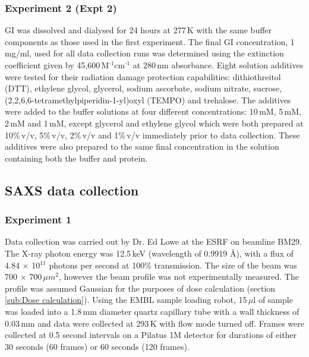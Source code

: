 \subsubsection{Experiment 2 (Expt 2)}
\label{subs:Experiment 2 - sample prep}
GI was dissolved and dialysed for 24 hours at 277$\,$K with the same buffer components as those used in the first experiment.
The final GI concentration, 1\,mg/ml, used for all data collection runs was determined using the extinction coefficient given by 45,600\,M$^{\text{-1}}$cm$^{\text{-1}}$ at 280\,nm absorbance.
Eight solution additives were tested for their radiation damage protection capabilities: dithiothreitol (DTT), ethylene glycol, glycerol, sodium ascorbate, sodium nitrate, sucrose, (2,2,6,6-tetramethylpiperidin-1-yl)oxyl (TEMPO) and trehalose.
The additives were added to the buffer solutions at four different concentrations: 10$\,$mM, 5$\,$mM, 2$\,$mM and 1$\,$mM, except glycerol and ethylene glycol which were both prepared at 10\%$\,$v/v, 5\%$\,$v/v, 2\%$\,$v/v and 1\%$\,$v/v immediately prior to data collection.
These additives were also prepared to the same final concentration in the solution containing both the buffer and protein.

\subsection{SAXS data collection}
\label{sub:SAXS data collection}

\subsubsection{Experiment 1}
\label{subs:Experiment 1- data col}
Data collection was carried out by Dr. Ed Lowe at the ESRF on beamline BM29.
The X-ray photon energy was 12.5$\,$keV (wavelength of 0.9919 \AA), with a flux of 4.84 $\times$ 10$^{\text{11}}$ photons per second at 100\% transmission.
The size of the beam was 700 $\times$ 700$\,\mu m^{\text{2}}$, however the beam profile was not experimentally measured.
The profile was assumed Gaussian for the purposes of dose calculation (section \ref{sub:Dose calculation}).
Using the EMBL sample loading robot, 15$\,\mu$l of sample was loaded into a 1.8$\,$mm diameter quartz capillary tube with a wall thickness of 0.03$\,$mm and data were collected at 293$\,$K with flow mode turned off.
Frames were collected at 0.5 second intervals on a Pilatus 1M detector for durations of either 30 seconds (60 frames) or 60 seconds (120  frames).

